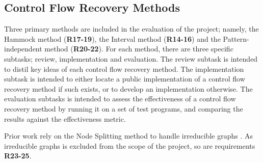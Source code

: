 
\subsection{Control Flow Recovery Methods}
\label{sec:requirements_control_flow_recovery_methods}

Three primary methods are included in the evaluation of the project; namely, the Hammock method (\textbf{R17-19}), the Interval method (\textbf{R14-16}) and the Pattern-independent method (\textbf{R20-22}). For each method, there are three specific subtasks; review, implementation and evaluation. The review subtask is intended to distil key ideas of each control flow recovery method. The implementation subtask is intended to either locate a public implementation of a control flow recovery method if such exists, or to develop an implementation otherwise. The evaluation subtasks is intended to assess the effectiveness of a control flow recovery method by running it on a set of test programs, and comparing the results against the effectiveness metric.

Prior work rely on the Node Splitting method to handle irreducible graphs \cite{node_splitting}. As irreducible graphs is excluded from the scope of the project, so are requirements \textbf{R23-25}.

